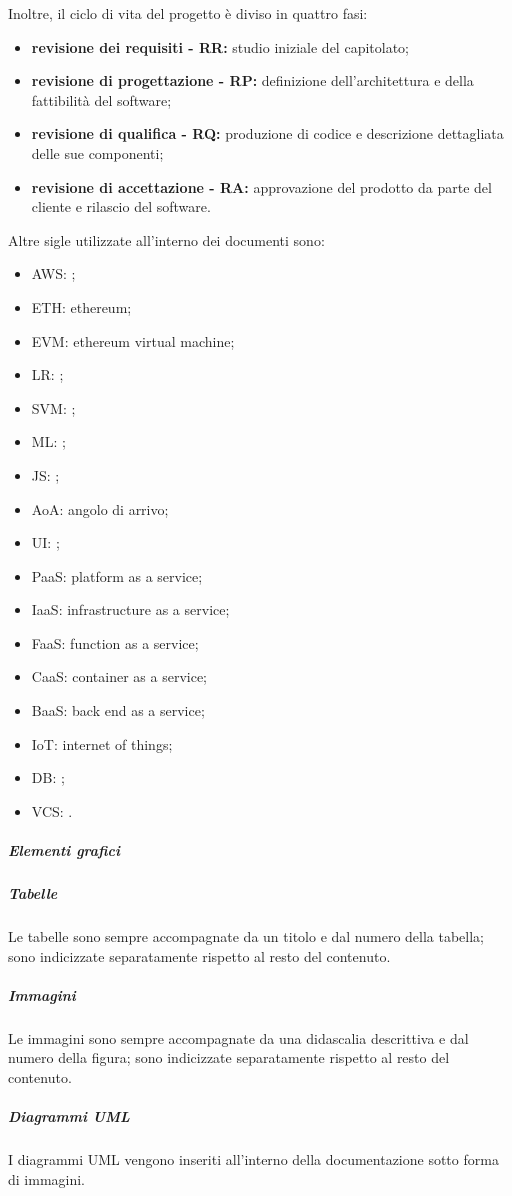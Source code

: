 					Inoltre, il ciclo di vita del progetto è diviso in quattro fasi:
					\begin{itemize}
						\item \textbf{revisione dei requisiti - RR:} studio iniziale del capitolato;
						\item \textbf{revisione di progettazione - RP:} definizione dell'architettura e della fattibilità del software;
						\item \textbf{revisione di qualifica - RQ:} produzione di codice e descrizione dettagliata delle sue componenti;
						\item \textbf{revisione di accettazione - RA:} approvazione del prodotto da parte del cliente e rilascio del software.
					\end{itemize}
					Altre sigle utilizzate all'interno dei documenti sono:
					\begin{itemize}
						\item AWS: ;
						\item ETH: ethereum;
						\item EVM: ethereum virtual machine;
						\item LR: ;
						\item SVM: ;
						\item ML: ;
						\item JS: ;
						\item AoA: angolo di arrivo;
						\item UI: ;
						\item PaaS: platform as a service;
						\item IaaS: infrastructure as a service;
						\item FaaS: function as a service;
						\item CaaS: container as a service;
						\item BaaS: back end as a service;
						\item IoT: internet of things;
						\item DB: ;
						\item VCS: .
					\end{itemize}	
			
			\subparagraph{Elementi grafici}
				\subparagraph{Tabelle}
					Le tabelle sono sempre accompagnate da un titolo e dal numero della tabella; sono indicizzate separatamente rispetto al resto del contenuto.
				\subparagraph{Immagini}
					Le immagini sono sempre accompagnate da una didascalia descrittiva e dal numero della figura; sono indicizzate separatamente rispetto al resto del contenuto.
				\subparagraph{Diagrammi UML}
					I diagrammi UML vengono inseriti all'interno della documentazione sotto forma di immagini.	



